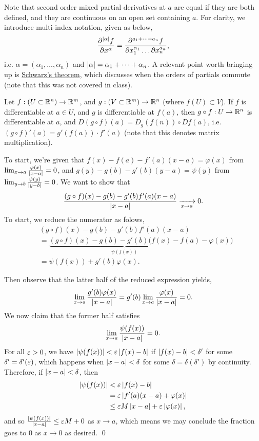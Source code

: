 \noindent Note that second order mixed partial derivatives at $a$ are equal if they are both defined, and they are continuous on an open set containing $a$. For clarity, we introduce multi-index notation, given as below,
\[ \frac{\partial^{\left\lvert \alpha \right\rvert} f}{\partial x^\alpha} = \frac{\partial^{a_1 + \dots + a_n} f}{\partial x_1^{\alpha_1} \dots \partial x_n^{a_n}}, \]
i.e. $\alpha = (\alpha_1, \dots, \alpha_n)$ and $\left\lvert \alpha \right\rvert = \alpha_1 + \dots + \alpha_n$. A relevant point worth bringing up is \href{https://en.wikipedia.org/wiki/Symmetry_of_second_derivatives#Schwarz's_theorem}{Schwarz's theorem}, which discusses when the orders of partials commute (note that this was not covered in class).
\begin{simplethm}
    Let $f : (U \subset \mathbb R^n) \to \mathbb R^m$, and $g : (V \subset \mathbb R^m) \to \mathbb R^n$ (where $f(U) \subset V$). If $f$ is differentiable at $a \in U$, and $g$ is differentiable at $f(a)$, then $g \circ f : U \to \mathbb R^n$ is differentiable at $a$, and $D(g \circ f)(a) = D_g(f(n)) \circ Df(a)$, i.e. $(g \circ f)'(a) = g' (f(a)) \cdot f'(a)$ (note that this denotes matrix multiplication).
\end{simplethm}
\noindent To start, we're given that $f(x) - f(a) - f'(a)(x - a) = \varphi(x)$ from $\lim_{x \to a} \frac{\varphi(x)}{\left\lvert x - a \right\rvert} = 0$, and $g(y) - g(b) - g'(b)(y - a) = \psi(y)$ from $\lim_{y \to b} \frac{\psi(y)}{\left\lvert y - b \right\rvert} = 0$. We want to show that
\[ \frac{(g \circ f)(x) - g(b) - g'(b) f'(a) (x - a)}{\left\lvert x - a \right\rvert} \xrightarrow[x \to a]{} 0. \]
To start, we reduce the numerator as folows,
\begin{align*}
    & (g \circ f)(x) - g(b) - g'(b) f'(a) (x - a) \\
    &= \underbrace{(g \circ f)(x) - g(b) - g'(b)(f(x) - f(a)}_{\psi(f(x))} - \varphi(x)) \\
    &= \psi(f(x)) + g'(b) \varphi(x).
\end{align*}

\newpage
\noindent Then observe that the latter half of the reduced expression yields,
\[ \lim_{x \to a} \frac{g'(b) \varphi(x)}{\left\lvert x - a \right\rvert} = g'(b) \lim_{x \to a} \frac{\varphi(x)}{\left\lvert x - a \right\rvert} = 0. \]
We now claim that the former half satisfies
\[ \lim_{x \to a} \frac{\psi(f(x))}{\left\lvert x - a \right\rvert} = 0. \]
For all $\varepsilon > 0$, we have $\left\lvert \psi(f(x)) \right\rvert < \varepsilon \left\lvert f(x) - b \right\rvert$ if $\left\lvert f(x) - b \right\rvert < \delta'$ for some $\delta' = \delta'(\varepsilon)$, which happens when $\left\lvert x - a \right\rvert < \delta$ for some $\delta = \delta(\delta')$ by continuity. Therefore, if $\left\lvert x - a \right\rvert < \delta$, then
\begin{align*}
    \left\lvert \psi(f(x)) \right\rvert &< \varepsilon \left\lvert f(x) - b \right\rvert \\
    &= \varepsilon \left\lvert f'(a)(x - a) + \varphi(x) \right\rvert \\
    &\leq \varepsilon M \left\lvert x - a \right\rvert + \varepsilon \left\lvert \varphi(x) \right\rvert,
\end{align*}
and so $\frac{\left\lvert \psi(f(x)) \right\rvert}{\left\lvert x - a \right\rvert} \leq \varepsilon M + 0$ as $x \to a$, which means we may conclude the fraction goes to $0$ as $x \to 0$ as desired. \qed